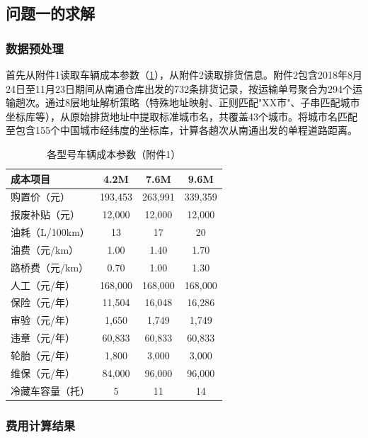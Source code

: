 \subsection{问题一的求解}

\subsubsection{数据预处理}

首先从附件1读取车辆成本参数（\cref{tab:vehicle-costs}），从附件2读取排货信息。附件2包含2018年8月24日至11月23日期间从南通仓库出发的732条排货记录，按运输单号聚合为294个运输趟次。通过8层地址解析策略（特殊地址映射、正则匹配"XX市"、子串匹配城市坐标库等），从原始排货地址中提取标准城市名，共覆盖43个城市。将城市名匹配至包含155个中国城市经纬度的坐标库，计算各趟次从南通出发的单程道路距离。

\begin{table}[!h]
    \centering
    \begin{tabular}{lccc}
        \toprule[1.5pt]
        成本项目 & 4.2M & 7.6M & 9.6M \\
        \midrule[1pt]
        购置价（元）& 193{,}453 & 263{,}991 & 339{,}359 \\
        报废补贴（元）& 12{,}000 & 12{,}000 & 12{,}000 \\
        油耗（L/100km）& 13 & 17 & 20 \\
        油费（元/km）& 1.00 & 1.40 & 1.70 \\
        路桥费（元/km）& 0.70 & 1.00 & 1.30 \\
        人工（元/年）& 168{,}000 & 168{,}000 & 168{,}000 \\
        保险（元/年）& 11{,}504 & 16{,}048 & 16{,}286 \\
        审验（元/年）& 1{,}650 & 1{,}749 & 1{,}749 \\
        违章（元/年）& 60{,}833 & 60{,}833 & 60{,}833 \\
        轮胎（元/年）& 1{,}800 & 3{,}000 & 3{,}000 \\
        维保（元/年）& 84{,}000 & 96{,}000 & 96{,}000 \\
        冷藏车容量（托）& 5 & 11 & 14 \\
        \bottomrule[1.5pt]
    \end{tabular}\caption{各型号车辆成本参数（附件1）}
    \label{tab:vehicle-costs}

\end{table}

\subsubsection{费用计算结果}

